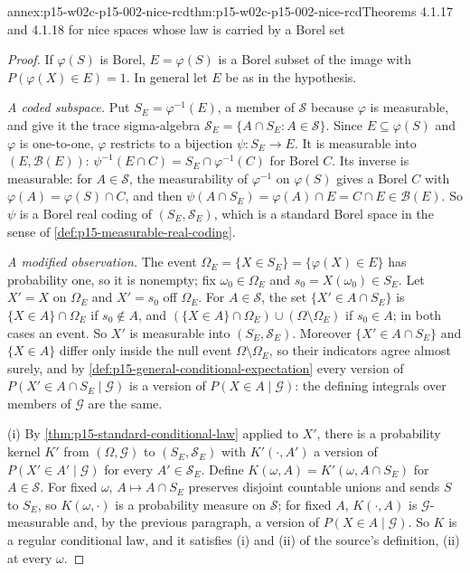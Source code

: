 \begin{annexitem}{annex:p15-w02c-p15-002-nice-rcd}{thm:p15-w02c-p15-002-nice-rcd}{Theorems 4.1.17 and 4.1.18 for nice spaces whose law is carried by a Borel set}
\begin{proof}
If \(\varphi(S)\) is Borel, \(E=\varphi(S)\) is a Borel subset of the image
with \(P(\varphi(X)\in E)=1\). In general let \(E\) be as in the
hypothesis.

\emph{A coded subspace.} Put \(S_E=\varphi^{-1}(E)\), a member of
\(\mathcal S\) because \(\varphi\) is measurable, and give it the trace
sigma-algebra \(\mathcal S_E=\{A\cap S_E:A\in\mathcal S\}\). Since
\(E\subseteq\varphi(S)\) and \(\varphi\) is one-to-one, \(\varphi\)
restricts to a bijection \(\psi:S_E\to E\). It is measurable into
\((E,\mathcal B(E))\): \(\psi^{-1}(E\cap C)=S_E\cap\varphi^{-1}(C)\) for
Borel \(C\). Its inverse is measurable: for \(A\in\mathcal S\), the
measurability of \(\varphi^{-1}\) on \(\varphi(S)\) gives a Borel \(C\)
with \(\varphi(A)=\varphi(S)\cap C\), and then
\(\psi(A\cap S_E)=\varphi(A)\cap E=C\cap E\in\mathcal B(E)\). So \(\psi\) is
a Borel real coding of \((S_E,\mathcal S_E)\), which is a standard Borel
space in the sense of \cref{def:p15-measurable-real-coding}.

\emph{A modified observation.} The event
\(\Omega_E=\{X\in S_E\}=\{\varphi(X)\in E\}\) has probability one, so it is
nonempty; fix \(\omega_0\in\Omega_E\) and \(s_0=X(\omega_0)\in S_E\). Let
\(X'=X\) on \(\Omega_E\) and \(X'=s_0\) off \(\Omega_E\). For
\(A\in\mathcal S\), the set \(\{X'\in A\cap S_E\}\) is
\(\{X\in A\}\cap\Omega_E\) if \(s_0\notin A\), and
\((\{X\in A\}\cap\Omega_E)\cup(\Omega\setminus\Omega_E)\) if \(s_0\in A\);
in both cases an event. So \(X'\) is measurable into
\((S_E,\mathcal S_E)\). Moreover \(\{X'\in A\cap S_E\}\) and
\(\{X\in A\}\) differ only inside the null event
\(\Omega\setminus\Omega_E\), so their indicators agree almost surely, and
by \cref{def:p15-general-conditional-expectation} every version of
\(P(X'\in A\cap S_E\mid\mathcal G)\) is a version of
\(P(X\in A\mid\mathcal G)\): the defining integrals over members of
\(\mathcal G\) are the same.

(i) By \cref{thm:p15-standard-conditional-law} applied to \(X'\), there is
a probability kernel \(K'\) from \((\Omega,\mathcal G)\) to
\((S_E,\mathcal S_E)\) with \(K'(\cdot,A')\) a version of
\(P(X'\in A'\mid\mathcal G)\) for every \(A'\in\mathcal S_E\). Define
\(K(\omega,A)=K'(\omega,A\cap S_E)\) for \(A\in\mathcal S\). For fixed
\(\omega\), \(A\mapsto A\cap S_E\) preserves disjoint countable unions and
sends \(S\) to \(S_E\), so \(K(\omega,\cdot)\) is a probability measure on
\(\mathcal S\); for fixed \(A\), \(K(\cdot,A)\) is \(\mathcal G\)-measurable
and, by the previous paragraph, a version of \(P(X\in A\mid\mathcal G)\).
So \(K\) is a regular conditional law, and it satisfies (i) and (ii) of the
source's definition, (ii) at every \(\omega\).


\end{proof}
\end{annexitem}
